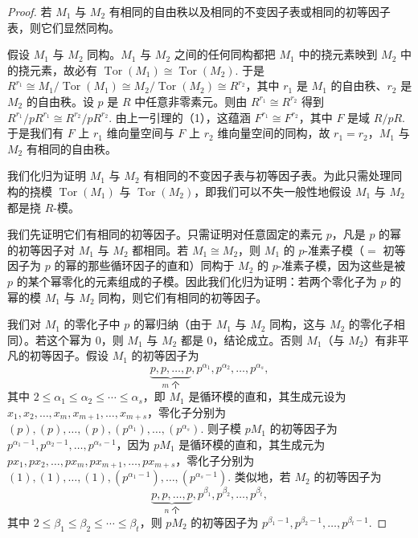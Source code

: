 \begin{proof}
若 \(M_1\) 与 \(M_2\) 有相同的自由秩以及相同的不变因子表或相同的初等因子表，则它们显然同构。

假设 \(M_1\) 与 \(M_2\) 同构。\(M_1\) 与 \(M_2\) 之间的任何同构都把 \(M_1\) 中的挠元素映到 \(M_2\) 中的挠元素，故必有 \(\operatorname{Tor}(M_1) \cong \operatorname{Tor}(M_2)\). 于是 \(R^{r_1} \cong M_1/\operatorname{Tor}(M_1) \cong M_2/\operatorname{Tor}(M_2) \cong R^{r_2}\)，其中 \(r_1\) 是 \(M_1\) 的自由秩、\(r_2\) 是 \(M_2\) 的自由秩。设 \(p\) 是 \(R\) 中任意非零素元。则由 \(R^{r_1} \cong R^{r_2}\) 得到 \(R^{r_1}/pR^{r_1} \cong R^{r_2}/pR^{r_2}\). 由上一引理的（1），这蕴涵 \(F^{r_1} \cong F^{r_2}\)，其中 \(F\) 是域 \(R/pR\). 于是我们有 \(F\) 上 \(r_1\) 维向量空间与 \(F\) 上 \(r_2\) 维向量空间的同构，故 \(r_1 = r_2\)，\(M_1\) 与 \(M_2\) 有相同的自由秩。

我们化归为证明 \(M_1\) 与 \(M_2\) 有相同的不变因子表与初等因子表。为此只需处理同构的挠模 \(\operatorname{Tor}(M_1)\) 与 \(\operatorname{Tor}(M_2)\)，即我们可以不失一般性地假设 \(M_1\) 与 \(M_2\) 都是挠 \(R\)-模。

我们先证明它们有相同的初等因子。只需证明对任意固定的素元 \(p\)，凡是 \(p\) 的幂的初等因子对 \(M_1\) 与 \(M_2\) 都相同。若 \(M_1 \cong M_2\)，则 \(M_1\) 的 \(p\)-准素子模（\(=\) 初等因子为 \(p\) 的幂的那些循环因子的直和）同构于 \(M_2\) 的 \(p\)-准素子模，因为这些是被 \(p\) 的某个幂零化的元素组成的子模。因此我们化归为证明：若两个零化子为 \(p\) 的幂的模 \(M_1\) 与 \(M_2\) 同构，则它们有相同的初等因子。

我们对 \(M_1\) 的零化子中 \(p\) 的幂归纳（由于 \(M_1\) 与 \(M_2\) 同构，这与 \(M_2\) 的零化子相同）。若这个幂为 0，则 \(M_1\) 与 \(M_2\) 都是 0，结论成立。否则 \(M_1\)（与 \(M_2\)）有非平凡的初等因子。假设 \(M_1\) 的初等因子为
\[
\underbrace{p, p, \ldots, p}_{m \text{ 个}}, p^{\alpha_1}, p^{\alpha_2}, \ldots, p^{\alpha_s},
\]
其中 \(2 \leq \alpha_1 \leq \alpha_2 \leq \cdots \leq \alpha_s\)，即 \(M_1\) 是循环模的直和，其生成元设为 \(x_1, x_2, \ldots, x_m, x_{m+1}, \ldots, x_{m+s}\)，零化子分别为 \((p), (p), \ldots, (p), (p^{\alpha_1}), \ldots, (p^{\alpha_s})\). 则子模 \(pM_1\) 的初等因子为 \(p^{\alpha_1-1}, p^{\alpha_2-1}, \ldots, p^{\alpha_s-1}\)，因为 \(pM_1\) 是循环模的直和，其生成元为 \(px_1, px_2, \ldots, px_m, px_{m+1}, \ldots, px_{m+s}\)，零化子分别为 \((1), (1), \ldots, (1), (p^{\alpha_1-1}), \ldots, (p^{\alpha_s-1})\). 类似地，若 \(M_2\) 的初等因子为
\[
\underbrace{p, p, \ldots, p}_{n \text{ 个}}, p^{\beta_1}, p^{\beta_2}, \ldots, p^{\beta_t},
\]
其中 \(2 \leq \beta_1 \leq \beta_2 \leq \cdots \leq \beta_t\)，则 \(pM_2\) 的初等因子为 \(p^{\beta_1-1}, p^{\beta_2-1}, \ldots, p^{\beta_t-1}\).


\end{proof}
